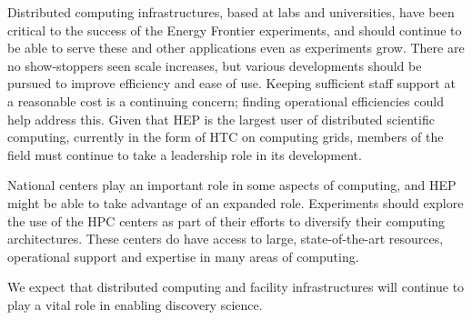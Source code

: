 Distributed computing infrastructures, based at labs and universities, have been critical to the success of the Energy Frontier experiments, and should continue to be able to serve these and other applications even as experiments grow.  There are no show-stoppers seen scale increases, but various developments should be pursued to improve efficiency and ease of use.  Keeping sufficient staff support at a reasonable cost is a continuing concern; finding operational efficiencies could help address this.  Given that HEP is the largest user of distributed scientific computing, currently in the form of HTC on computing grids, members of the field must continue to take a leadership role in its development.

National centers play an important role in some aspects of computing, and HEP might be able to take advantage of an expanded role.  Experiments should explore the use of the HPC centers as part of their efforts to diversify their computing architectures.  These centers do have access to large, state-of-the-art resources, operational support and expertise in many areas of computing.

We expect that distributed computing and facility infrastructures will continue to play a vital role in enabling discovery science.

